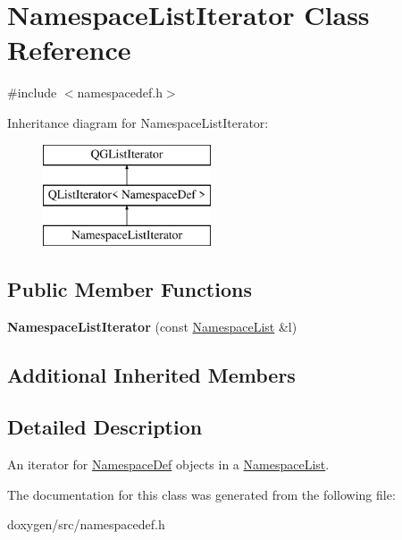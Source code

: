 \hypertarget{class_namespace_list_iterator}{}\section{Namespace\+List\+Iterator Class Reference}
\label{class_namespace_list_iterator}


{\ttfamily \#include $<$namespacedef.\+h$>$}

Inheritance diagram for Namespace\+List\+Iterator\+:\begin{figure}[H]
\begin{center}
\leavevmode
\includegraphics[height=3.000000cm]{class_namespace_list_iterator}
\end{center}
\end{figure}
\subsection*{Public Member Functions}
\begin{DoxyCompactItemize}
\item 
\mbox{\label{class_namespace_list_iterator_a4e8539142f60572b02b40228ba2d8111}} 
{\bfseries Namespace\+List\+Iterator} (const \mbox{\hyperlink{class_namespace_list}{Namespace\+List}} \&l)
\end{DoxyCompactItemize}
\subsection*{Additional Inherited Members}


\subsection{Detailed Description}
An iterator for \mbox{\hyperlink{class_namespace_def}{Namespace\+Def}} objects in a \mbox{\hyperlink{class_namespace_list}{Namespace\+List}}. 

The documentation for this class was generated from the following file\+:\begin{DoxyCompactItemize}
\item 
doxygen/src/namespacedef.\+h\end{DoxyCompactItemize}
